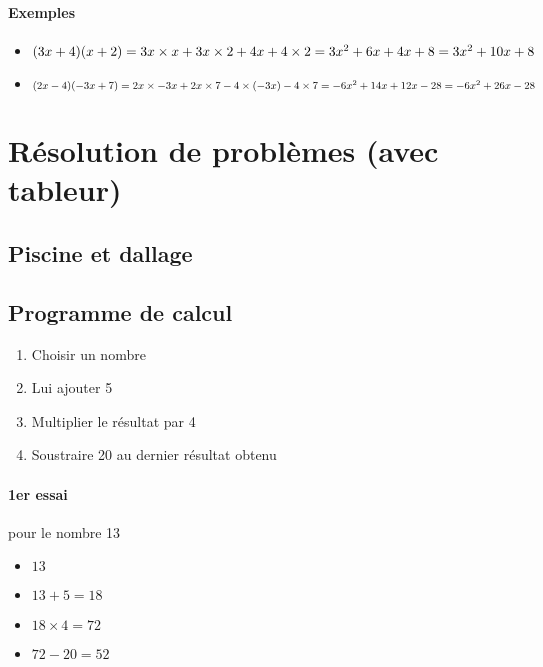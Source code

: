 \documentclass[
	a4paper,
	twocolumn=false,
	12pts,
	DIV=calc]%
	{article}
\begin{document}
\paragraph{Exemples}
\begin{itemize}
\item
\begin{math}
	(3x + 4)(x+2)\\
	= 3x\times x + 3x\times 2 + 4x + 4\times 2\\
	= 3x^2 + 6x + 4x + 8\\
	= 3x^2 + 10x + 8
\end{math}
\item
\begin{math}
	(2x-4)(-3x+7)\\
	= 2x \times -3x + 2x \times 7 -4 \times (-3x) -4\times 7\\
	= -6x^2 + 14x + 12x -28\\
	=-6x^2 + 26x - 28
\end{math}
\end{itemize}

\section{Résolution de problèmes (avec tableur)}
\subsection{Piscine et dallage}
\subsection{Programme de calcul}

\begin{enumerate}
	\item Choisir un nombre
	\item Lui ajouter 5
	\item Multiplier le résultat par 4
	\item Soustraire 20 au dernier résultat obtenu
\end{enumerate}

\paragraph{1er essai}pour le nombre 13\\
\begin{itemize}
	\item $13$
	\item $13+5=18$
	\item $18\times 4 = 72$
	\item $72-20=52$
\end{itemize}
\end{document}
